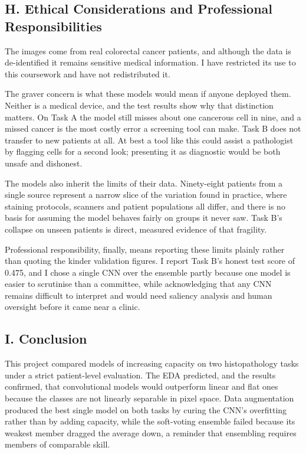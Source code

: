 \documentclass[
  11pt,
]{article}
\begin{document}
\hypertarget{h.-ethical-considerations-and-professional-responsibilities}{%
\subsection{H. Ethical Considerations and Professional
Responsibilities}\label{h.-ethical-considerations-and-professional-responsibilities}}

The images come from real colorectal cancer patients, and although the
data is de-identified it remains sensitive medical information. I have
restricted its use to this coursework and have not redistributed it.

The graver concern is what these models would mean if anyone deployed
them. Neither is a medical device, and the test results show why that
distinction matters. On Task A the model still misses about one
cancerous cell in nine, and a missed cancer is the most costly error a
screening tool can make. Task B does not transfer to new patients at
all. At best a tool like this could assist a pathologist by flagging
cells for a second look; presenting it as diagnostic would be both
unsafe and dishonest.

The models also inherit the limits of their data. Ninety-eight patients
from a single source represent a narrow slice of the variation found in
practice, where staining protocols, scanners and patient populations all
differ, and there is no basis for assuming the model behaves fairly on
groups it never saw. Task B's collapse on unseen patients is direct,
measured evidence of that fragility.

Professional responsibility, finally, means reporting these limits
plainly rather than quoting the kinder validation figures. I report Task
B's honest test score of 0.475, and I chose a single CNN over the
ensemble partly because one model is easier to scrutinise than a
committee, while acknowledging that any CNN remains difficult to
interpret and would need saliency analysis and human oversight before it
came near a clinic.

\hypertarget{i.-conclusion}{%
\subsection{I. Conclusion}\label{i.-conclusion}}

This project compared models of increasing capacity on two
histopathology tasks under a strict patient-level evaluation. The EDA
predicted, and the results confirmed, that convolutional models would
outperform linear and flat ones because the classes are not linearly
separable in pixel space. Data augmentation produced the best single
model on both tasks by curing the CNN's overfitting rather than by
adding capacity, while the soft-voting ensemble failed because its
weakest member dragged the average down, a reminder that ensembling
requires members of comparable skill.
\end{document}
